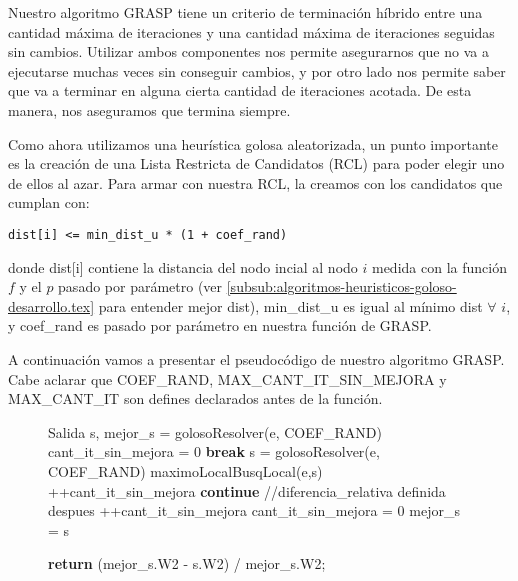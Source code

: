 Nuestro algoritmo GRASP tiene un criterio de terminación híbrido entre una cantidad máxima de iteraciones y una cantidad máxima de iteraciones seguidas sin cambios. Utilizar ambos componentes nos permite asegurarnos que no va a ejecutarse muchas veces sin conseguir cambios, y por otro lado nos permite saber que va a terminar en alguna cierta cantidad de iteraciones acotada. De esta manera, nos aseguramos que termina siempre.

Como ahora utilizamos una heurística golosa aleatorizada, un punto importante es la creación de una Lista Restricta de Candidatos (RCL) para poder elegir uno de ellos al azar. Para armar con nuestra RCL, la creamos con los candidatos que cumplan con:

\begin{verbatim}
dist[i] <= min_dist_u * (1 + coef_rand)
\end{verbatim}

donde dist[i] contiene la distancia del nodo incial al nodo $i$ medida con la función $f$ y el $p$ pasado por parámetro (ver \ref{subsub:algoritmos-heuristicos-goloso-desarrollo.tex} para entender mejor dist), min\_dist\_u es igual al mínimo dist $\forall$ $i$, y coef\_rand es pasado por parámetro en nuestra función de GRASP.

A continuación vamos a presentar el pseudocódigo de nuestro algoritmo GRASP. Cabe aclarar que COEF\_RAND, MAX\_CANT\_IT\_SIN\_MEJORA y MAX\_CANT\_IT son defines declarados antes de la función.

\begin{center}
 \begin{figure}[H]
  \begin{pseudo}
    \State Salida s, mejor\_s = golosoResolver(e, COEF\_RAND)
    \State cant\_it\_sin\_mejora = 0   
	\State \textbf{break}
      \EndIf
      \State s = golosoResolver(e, COEF\_RAND)
      \State maximoLocalBusqLocal(e,s)
	\State++cant\_it\_sin\_mejora
	\State \textbf{continue}
      \EndIf
       //diferencia\_relativa definida despues
	\State ++cant\_it\_sin\_mejora
      \Else
	\State cant\_it\_sin\_mejora = 0
      \EndIf
	\State mejor\_s = s
      \EndIf
    \EndWhile
    \EndProcedure
  \end{pseudo}
 \end{figure}
\end{center}

\begin{center}
 \begin{figure}[H]
  \begin{pseudo}
  \State \textbf{return} (mejor\_s.W2 - s.W2) / mejor\_s.W2;
  \EndProcedure
  \end{pseudo}
 \end{figure}
\end{center}